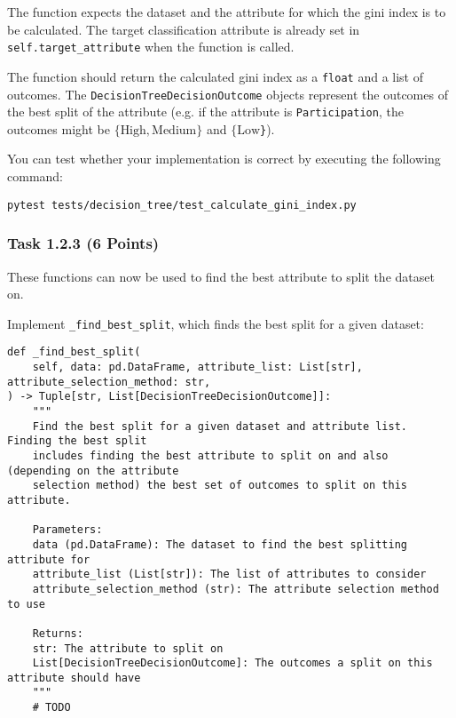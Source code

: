\documentclass[
english,
smallborders
]{i6prcsht}
\newcommand{\points}[1]{\hfill \color{red}(#1 Points)\color{black}}
\begin{document}
\vspace*{0.1cm}

The function expects the dataset and the attribute for which the gini index is to be calculated. The target classification attribute is already set in \texttt{self.target\_attribute} when the function is called.

The function should return the calculated gini index as a \texttt{float} and a list of outcomes. The \texttt{DecisionTreeDecisionOutcome} objects represent the outcomes of the best split of the attribute (e.g. if the attribute is \texttt{Participation}, the outcomes might be \texttt{$\{\text{High}, \text{Medium}\}$} and \texttt{$\{\text{Low}$\}}).

You can test whether your implementation is correct by executing the following command:

\vspace*{0.3cm}

\begin{lstlisting}
pytest tests/decision_tree/test_calculate_gini_index.py
\end{lstlisting}

\vspace*{0.1cm}

\subsubsection*{Task 1.2.3 \points{6}}

These functions can now be used to find the best attribute to split the dataset on.

Implement \texttt{\_find\_best\_split}, which finds the best split for a given dataset:

\vspace*{0.3cm}

\newpage

\begin{lstlisting}
def _find_best_split(
	self, data: pd.DataFrame, attribute_list: List[str], attribute_selection_method: str,
) -> Tuple[str, List[DecisionTreeDecisionOutcome]]:
	"""
	Find the best split for a given dataset and attribute list. Finding the best split
	includes finding the best attribute to split on and also (depending on the attribute
	selection method) the best set of outcomes to split on this attribute.

	Parameters:
	data (pd.DataFrame): The dataset to find the best splitting attribute for
	attribute_list (List[str]): The list of attributes to consider
	attribute_selection_method (str): The attribute selection method to use

	Returns:
	str: The attribute to split on
	List[DecisionTreeDecisionOutcome]: The outcomes a split on this attribute should have
	"""
	# TODO
\end{lstlisting}
\end{document}
